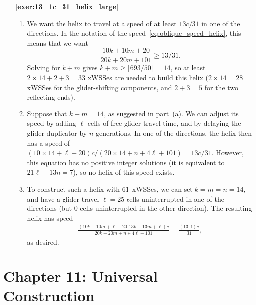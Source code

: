 \begin{multicols}{2}
\begin{itemize}[leftmargin=0em]
		
		\item[\bf\color{ocre}\sffamily\ref{exer:13_1c_31_helix_large}] \begin{enumerate}[leftmargin=1.5em,label=\bf\color{ocre}(\alph*)]
			\item We want the helix to travel at a speed of at least $13c/31$ in one of the directions. In the notation of the speed~\eqref{eq:oblique_speed_helix}, this means that we want
			\[
				\frac{10k + 10m + 20}{20k + 20m + 101} \geq 13/31.
			\]
			Solving for $k+m$ gives $k + m \geq \lceil 693/50 \rceil = 14$, so at least $2 \times 14 + 2 + 3 = 33$ xWSSes are needed to build this helix ($2 \times 14 = 28$ xWSSes for the glider-shifting components, and $2 + 3 = 5$ for the two reflecting ends).%
			
			\item Suppose that $k + m = 14$, as suggested in part~(a). We can adjust its speed by adding $\ell$ cells of free glider travel time, and by delaying the glider duplicator by $n$ generations. In one of the directions, the helix then has a speed of $(10 \times 14 + \ell + 20)c/(20 \times 14 + n + 4\ell + 101) = 13c/31$. However, this equation has no positive integer solutions (it is equivalent to $21\ell + 13n = 7$), so no helix of this speed exists.
			
			\item To construct such a helix with $61$~xWSSes, we can set $k = m = n = 14$, and have a glider travel $\ell = 25$ cells uninterrupted in one of the directions (but $0$ cells uninterrupted in the other direction). The resulting helix has speed
			\begin{align*}
				\frac{(10k + 10m + \ell + 20, 13k - 13m + \ell)c}{20k + 20m + n + 4\ell + 101} = \frac{(13,1)c}{31},
			\end{align*}
			as desired.
		\end{enumerate}
	\end{itemize}
\end{multicols}



\hypertarget{solutions_universal_construction}{}\label{solutions_universal_construction}
\section*{Chapter 11: Universal Construction}
\renewcommand{\chapterfolder}{universal_construction/}

